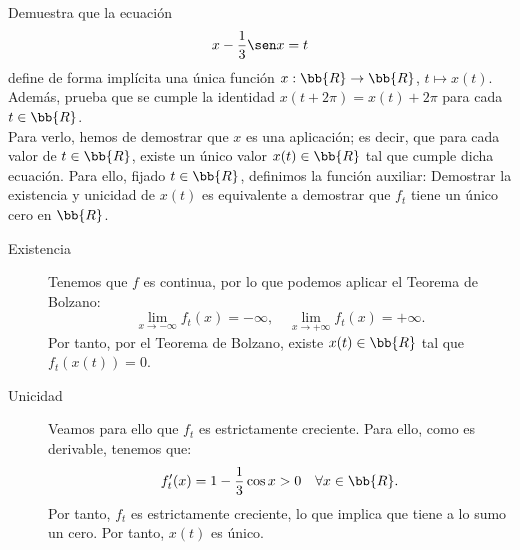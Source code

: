 \documentclass[12pt]{article}
\begin{document}
\begin{ejercicio}
    Demuestra que la ecuación
    \[
        x - \dfrac{1}{3} \sen x = t
    \]
    define de forma implícita una única función \(x : \bb{R} \to \bb{R}\), \(t \mapsto x(t)\). Además, prueba que se cumple la identidad \(x(t + 2\pi) = x(t) + 2\pi\) para cada \(t \in \bb{R}\).\\

    Para verlo, hemos de demostrar que $x$ es una aplicación; es decir, que para cada valor de $t\in \bb{R}$, existe un único valor $x(t)\in \bb{R}$ tal que cumple dicha ecuación.
    Para ello, fijado $t\in \bb{R}$, definimos la función auxiliar:
    Demostrar la existencia y unicidad de $x(t)$ es equivalente a demostrar que $f_t$ tiene un único cero en $\bb{R}$.
    \begin{description}
        \item[Existencia] Tenemos que $f$ es continua, por lo que podemos aplicar el Teorema de Bolzano:
        \begin{equation*}
            \lim_{x\to -\infty} f_t(x) = -\infty, \quad \lim_{x\to +\infty} f_t(x) = +\infty.
        \end{equation*}
        Por tanto, por el Teorema de Bolzano, existe $x(t)\in \bb{R}$ tal que $f_t(x(t)) = 0$.

        \item[Unicidad] Veamos para ello que $f_t$ es estrictamente creciente. Para ello, como es derivable, tenemos que:
        \begin{equation*}
            f_t'(x) = 1 - \dfrac{1}{3} \cos x > 0 \quad \forall x\in \bb{R}.
        \end{equation*}
        Por tanto, $f_t$ es estrictamente creciente, lo que implica que tiene a lo sumo un cero. Por tanto, $x(t)$ es único.
    \end{description}

\end{ejercicio}
\end{document}
